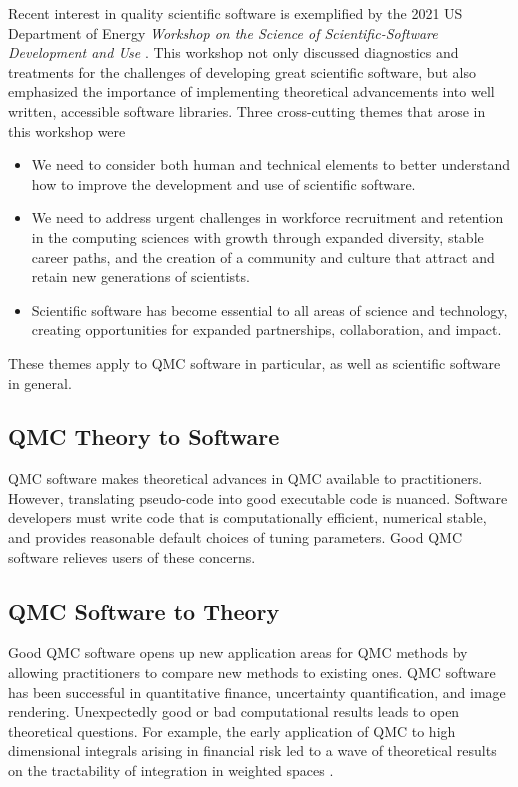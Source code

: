 \documentclass[graybox]{svmult}
\begin{document}
Recent interest in quality scientific software is exemplified by the 2021 US Department of Energy \emph{Workshop on the Science of Scientific-Software Development and Use} \cite{ASCR-SSSDU,osti_1846008}. This workshop not only discussed diagnostics and treatments for the challenges of developing great scientific software, but also emphasized the importance of implementing theoretical advancements into well written, accessible software libraries. Three cross-cutting themes that arose in this workshop were
\begin{itemize}
    \item  We need to consider both human and technical elements to better understand how to improve the development and use of scientific software.

    \item We need to address urgent challenges in workforce recruitment and retention in the computing sciences with growth through expanded diversity, stable career paths, and the creation of a community and culture that attract and retain new generations of scientists.

    \item Scientific software has become essential to all areas of science and technology, creating opportunities for expanded partnerships, collaboration, and impact.
\end{itemize}
These themes apply to QMC software in particular, as well as scientific software in general.

\subsection{QMC Theory to Software}

QMC software makes theoretical advances in QMC available to practitioners. However, translating pseudo-code into good executable code is nuanced.  Software developers must write code that is computationally efficient, numerical stable, and provides reasonable default choices of tuning parameters. Good QMC software relieves users of these concerns.

\subsection{QMC Software to Theory}

Good QMC software opens up new application areas for QMC methods by allowing practitioners to compare new methods to existing ones.  QMC software has been successful in quantitative finance, uncertainty quantification, and image rendering. Unexpectedly good or bad computational results leads to open theoretical questions.  For example, the early application of QMC to high dimensional integrals arising in financial risk \cite{PasTra95} led to a wave of theoretical results on the tractability of integration in weighted spaces \cite{Woz99a,DicEtal14a,NovWoz10a}.
\end{document}
